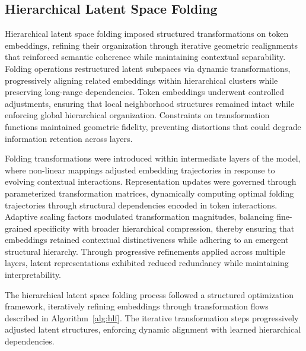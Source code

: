 \documentclass[5p,times]{elsarticle}
\begin{document}
\subsection{Hierarchical Latent Space Folding}

Hierarchical latent space folding imposed structured transformations on token embeddings, refining their organization through iterative geometric realignments that reinforced semantic coherence while maintaining contextual separability. Folding operations restructured latent subspaces via dynamic transformations, progressively aligning related embeddings within hierarchical clusters while preserving long-range dependencies. Token embeddings underwent controlled adjustments, ensuring that local neighborhood structures remained intact while enforcing global hierarchical organization. Constraints on transformation functions maintained geometric fidelity, preventing distortions that could degrade information retention across layers.

Folding transformations were introduced within intermediate layers of the model, where non-linear mappings adjusted embedding trajectories in response to evolving contextual interactions. Representation updates were governed through parameterized transformation matrices, dynamically computing optimal folding trajectories through structural dependencies encoded in token interactions. Adaptive scaling factors modulated transformation magnitudes, balancing fine-grained specificity with broader hierarchical compression, thereby ensuring that embeddings retained contextual distinctiveness while adhering to an emergent structural hierarchy. Through progressive refinements applied across multiple layers, latent representations exhibited reduced redundancy while maintaining interpretability.

The hierarchical latent space folding process followed a structured optimization framework, iteratively refining embeddings through transformation flows described in Algorithm~\ref{alg:hlf}. The iterative transformation steps progressively adjusted latent structures, enforcing dynamic alignment with learned hierarchical dependencies.
\end{document}
